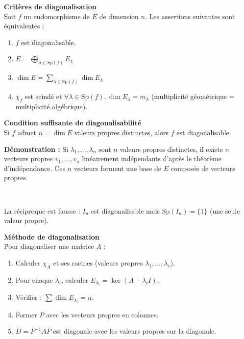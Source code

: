 \documentclass[../PolyS4.tex]{subfiles}
\begin{document}
\begin{Thm}\textbf{Critères de diagonalisation}\\

Soit $f$ un endomorphisme de $E$ de dimension $n$. Les assertions suivantes sont équivalentes :
\begin{enumerate}
    \item $f$ est diagonalisable.
    \item $E = \bigoplus_{\lambda \in \mathrm{Sp}(f)} E_{\lambda}$
    \item $\dim E = \sum_{\lambda \in \mathrm{Sp}(f)} \dim E_{\lambda}$
    \item $\chi_f$ est scindé et $\forall \lambda \in \mathrm{Sp}(f), \dim E_{\lambda} = m_{\lambda}$ (multiplicité géométrique = multiplicité algébrique).
\end{enumerate}
\end{Thm}

\begin{Prop}\textbf{Condition suffisante de diagonalisabilité}\\

Si $f$ admet $n = \dim E$ valeurs propres distinctes, alors $f$ est diagonalisable.
\end{Prop}

\begin{Rmq}
\textbf{Démonstration :}
Si $\lambda_1, \ldots, \lambda_n$ sont $n$ valeurs propres distinctes, il existe $n$ vecteurs propres $v_1, \ldots, v_n$ linéairement indépendants d'après le théorème d'indépendance. Ces $n$ vecteurs forment une base de $E$ composée de vecteurs propres.
\end{Rmq}


\begin{Rmq}$\,$

La réciproque est fausse : $I_n$ est diagonalisable mais $\mathrm{Sp}(I_n) = \{1\}$ (une seule valeur propre).
\end{Rmq}

\begin{Meth}\textbf{Méthode de diagonalisation}\\

Pour diagonaliser une matrice $A$ :
\begin{enumerate}
    \item Calculer $\chi_A$ et ses racines (valeurs propres $\lambda_1, \ldots, \lambda_r$).
    \item Pour chaque $\lambda_i$, calculer $E_{\lambda_i} = \ker(A - \lambda_i I)$.
    \item Vérifier : $\sum \dim E_{\lambda_i} = n$.
    \item Former $P$ avec les vecteurs propres en colonnes.
    \item $D = P^{-1}AP$ est diagonale avec les valeurs propres sur la diagonale.
\end{enumerate}
\end{Meth}
\end{document}
